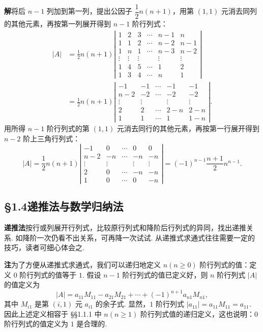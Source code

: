 \documentclass[UTF8,12pt,a4paper,fontset=fandol]{ctexart}
\begin{document}
\noindent\textbf{解}\quad 将后 $n-1$ 列加到第一列，提出公因子 $\dfrac12 n(n+1)$，用第 $(1,1)$ 元消去同列的其他元素，再按第一列展开得到 $n-1$ 阶行列式：
\[
\begin{aligned}
|A|
&=\frac12 n(n+1)
\left|\begin{array}{cccccc}
1 & 2 & 3 & \cdots & n-1 & n\\
1 & 1 & 2 & \cdots & n-2 & n-1\\
1 & n & 1 & \cdots & n-3 & n-2\\
\vdots & \vdots & \vdots &        & \vdots & \vdots\\
1 & 4 & 5 & \cdots & 1 & 2\\
1 & 3 & 4 & \cdots & n & 1
\end{array}\right|\\
&=\frac12 n(n+1)
\left|\begin{array}{ccccc}
-1 & -1 & \cdots & -1 & -1\\
n-2 & -2 & \cdots & -2 & -2\\
\vdots & \vdots &        & \vdots & \vdots\\
2 & 2 & \cdots & 2-n & 2-n\\
1 & 1 & \cdots & 1 & 1-n
\end{array}\right|.
\end{aligned}
\]
用所得 $n-1$ 阶行列式的第 $(1,1)$ 元消去同行的其他元素，再按第一行展开得到 $n-2$ 阶上三角行列式：
\[
|A|
=\frac12 n(n+1)
\left|\begin{array}{ccccc}
-1 & 0 & \cdots & 0 & 0\\
n-2 & -n & \cdots & -n & -n\\
\vdots & \vdots &        & \vdots & \vdots\\
2 & 0 & \cdots & -n & -n\\
1 & 0 & \cdots & 0 & -n
\end{array}\right|
=(-1)^{n-1}\frac{n+1}{2}n^{n-1}.
\]

\subsection*{§1.4\quad 递推法与数学归纳法}

\noindent\textbf{递推法}\quad 按行或列展开行列式，比较原行列式和降阶后行列式的异同，找出递推关系. 如降阶一次仍看不出关系，可再降一次试试. 从递推式求通式往往需要一定的技巧，读者可细心体会之.

\noindent\textbf{注}\quad 为了方便从递推式求通式，我们可以递归地定义 $n(n\ge0)$ 阶行列式的值：定义 $0$ 阶行列式的值等于 $1$. 假设 $n-1$ 阶行列式的值已定义好，则 $n$ 阶行列式 $|A|$ 的值定义为
\[
|A|=a_{11}M_{11}-a_{21}M_{21}+\cdots+(-1)^{n+1}a_{n1}M_{n1},
\]
其中 $M_{i1}$ 是第 $(i,1)$ 元 $a_{i1}$ 的余子式. 显然，$1$ 阶行列式 $|a_{11}|=a_{11}M_{11}=a_{11}$. 因此上述定义相容于 §§1.1.1 中 $n(n\ge1)$ 阶行列式值的递归定义，这也说明：$0$ 阶行列式的值定义为 $1$ 是合理的.
\end{document}
